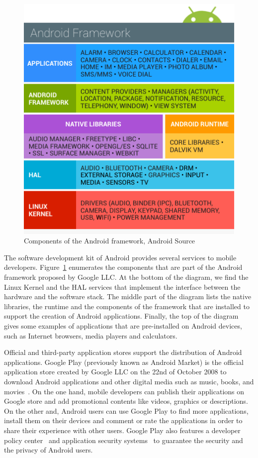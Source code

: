 \begin{figure}[!ht]
        \centering
	\includegraphics[width=0.6\linewidth]{figures/background/framework.png}
        \caption[Elements of the Android framework]{Components of the Android framework, Android Source~\cite{android_source_android_nodate}}
	\label{figure:background:framework}
\end{figure}

The software development kit of Android provides several services to mobile developers.
Figure~\ref{figure:background:framework} enumerates the components that are part of the Android framework proposed by Google LLC.
At the bottom of the diagram, we find the Linux Kernel and the HAL services that implement the interface between the hardware and the software stack.
The middle part of the diagram lists the native libraries, the runtime and the components of the framework that are installed to support the creation of Android applications.
Finally, the top of the diagram gives some examples of applications that are pre-installed on Android devices, such as Internet browsers, media players and calculators.

Official and third-party application stores support the distribution of Android applications.
Google Play (previously known as Android Market) is the official application store created by Google LLC on the 22nd of October 2008 to download Android applications and other digital media such as music, books, and movies~\cite{google_google_2019}.
On the one hand, mobile developers can publish their applications on Google store and add promotional contents like videos, graphics or descriptions.
On the other and, Android users can use Google Play to find more applications, install them on their devices and comment or rate the applications in order to share their experience with other users.
Google Play also features a developer policy center~\cite{android_developer_2019} and application security systems~\cite{google_google_2019-1} to guarantee the security and the privacy of Android users.
